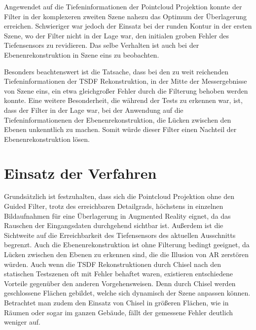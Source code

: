 Angewendet auf die Tiefeninformationen der Pointcloud Projektion konnte der Filter in der komplexeren zweiten Szene nahezu das Optimum der Überlagerung erreichen. Schwieriger war jedoch der Einsatz bei der runden Kontur in der ersten Szene, wo der Filter nicht in der Lage war, den initialen groben Fehler des Tiefensensors zu revidieren. Das selbe Verhalten ist auch bei der Ebenenrekonstruktion in Szene eins zu beobachten. 

Besonders beachtenswert ist die Tatsache, dass bei den zu weit reichenden Tiefeninformationen der TSDF Rekonstruktion, in der Mitte der Messergebnisse von Szene eins, ein etwa gleichgroßer Fehler durch die Filterung behoben werden konnte. Eine weitere Besonderheit, die während der Tests zu erkennen war, ist, dass der Filter in der Lage war, bei der Anwendung auf die Tiefeninformationenen der Ebenenrekonstruktion, die Lücken zwischen den Ebenen unkenntlich zu machen. Somit würde dieser Filter einen Nachteil der Ebenenrekonstruktion lösen.

\section{Einsatz der Verfahren}

Grundsätzlich ist festzuhalten, dass sich die Pointcloud Projektion ohne den Guided Filter, trotz des erreichbaren Detailgrads, höchstens in einzelnen Bildaufnahmen für eine Überlagerung in Augmented Reality eignet, da das Rauschen der Eingangsdaten durchgehend sichtbar ist. Außerdem ist die Sichtweite auf die Erreichbarkeit des Tiefensensors des aktuellen Ausschnitts begrenzt. Auch die Ebenenrekonstruktion ist ohne Filterung bedingt geeignet, da Lücken zwischen den Ebenen zu erkennen sind, die die Illusion von AR zerstören würden. Auch wenn die TSDF Rekonstruktionen durch Chisel nach den statischen Testszenen oft mit Fehler behaftet waren, existieren entschiedene Vorteile gegenüber den anderen Vorgehensweisen. Denn durch Chisel werden geschlossene Flächen gebildet, welche sich dynamisch der Szene anpassen können. Betrachtet man zudem den Einsatz von Chisel in größeren Flächen, wie in Räumen oder sogar im ganzen Gebäude, fällt der gemessene Fehler deutlich weniger auf.\\

